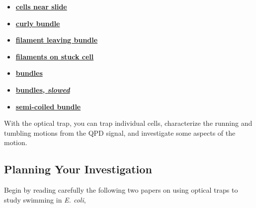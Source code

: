 \documentclass{../lab}
\begin{document}
\begin{itemize}
        \item \href{https://berkeley-physics111b.github.io/assets/pdf/oldwebsitestructure/cellsnearslide.mov}{\textbf{cells near slide}}

        \item \href{https://berkeley-physics111b.github.io/assets/pdf/oldwebsitestructure/curlybundle.mov}{\textbf{curly bundle}}

        \item \href{https://berkeley-physics111b.github.io/assets/pdf/oldwebsitestructure/filamentleavingbundle.mov}{\textbf{filament leaving bundle}}
        
        \item \href{https://berkeley-physics111b.github.io/assets/pdf/oldwebsitestructure/filamentsonstuckcell.mov}{\textbf{filaments on stuck cell}}
        
        \item \href{https://berkeley-physics111b.github.io/assets/pdf/oldwebsitestructure/fluorescentbundles.mov}{\textbf{bundles}}

        \item \href{https://berkeley-physics111b.github.io/assets/pdf/oldwebsitestructure/fluorescentbundlesslow.mov}{\textbf{bundles, \emph{slowed}}}

        \item \href{https://berkeley-physics111b.github.io/assets/pdf/oldwebsitestructure/semicoiledbundle.mov}{\textbf{semi-coiled bundle}}

\end{itemize}

With the optical trap, you can trap individual cells, characterize the running and tumbling motions from the QPD signal, and investigate some aspects of the motion.

\subsection{Planning Your Investigation}

Begin by reading carefully the following two papers on using optical traps to study swimming in \emph{E. coli},
\end{document}
